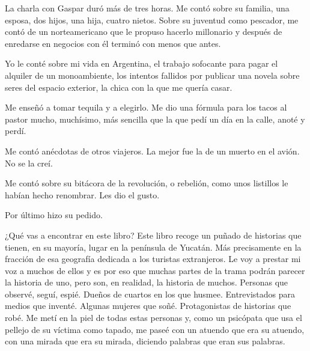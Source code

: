 \documentclass[12pt,twoside,openright,a5paper]{book}
\begin{document}
\vspace{0.5cm}

\hrulefill\hspace{0.2cm} \decofourleft\decofourright \hspace{0.2cm} \hrulefill
\vspace{0.5cm}

La charla con Gaspar duró más de tres horas. Me contó sobre su familia,
una esposa, dos hijos, una hija, cuatro nietos. Sobre su juventud como
pescador, me contó de un norteamericano que le propuso hacerlo millonario
y después de enredarse en negocios con él terminó con menos que antes.

Yo le conté sobre mi vida en Argentina, el trabajo sofocante para pagar el
alquiler de un monoambiente, los intentos fallidos por publicar una novela
sobre seres del espacio exterior, la chica con la que me quería casar.

Me enseñó a tomar tequila y a elegirlo. Me dio una fórmula para los
tacos al pastor mucho, muchísimo, más sencilla que la que pedí un día
en la calle, anoté y perdí.

Me contó anécdotas de otros viajeros. La mejor fue la de un muerto en el
avión. No se la creí.

Me contó sobre su bitácora de la revolución, o rebelión, como unos
listillos le habían hecho renombrar. Les dio el gusto.

Por último hizo su pedido.

\vspace{0.5cm}
\afterpage{}
\hrulefill\hspace{0.2cm} \decofourleft\decofourright \hspace{0.2cm} \hrulefill
\vspace{0.5cm}

¿Qué vas a encontrar en este libro? Este libro recoge un puñado
de historias que tienen, en su mayoría, lugar en la península de
Yucatán. Más precisamente en la fracción de esa geografía dedicada a
los turistas extranjeros. Le voy a prestar mi voz a muchos de ellos y es
por eso que muchas partes de la trama podrán parecer la historia de uno,
pero son, en realidad, la historia de muchos. Personas que observé, seguí,
espié. Dueños de cuartos en los que husmee. Entrevistados para medios
que inventé. Algunas mujeres que soñé. Protagonistas de historias que
robé. Me metí en la piel de todas estas personas y, como un psicópata
que usa el pellejo de su víctima como tapado, me paseé con un atuendo
que era su atuendo, con una mirada que era su mirada, diciendo palabras
que eran sus palabras.
\end{document}
